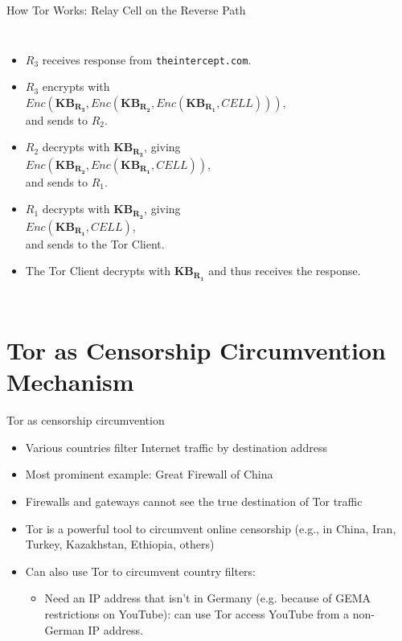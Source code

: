 \documentclass[9pt,a4paper]{beamer}
\begin{document}
\begin{frame}{How Tor Works: Relay Cell on the Reverse Path}
\begin{columns}
    \begin{itemize}
      \item $R_3$ receives response from \texttt{theintercept.com}.
      \item<2-> $R_3$ encrypts with \\
        $Enc(\mathbf{KB_{R_3}}, Enc(\mathbf{KB_{R_2}}, Enc(\mathbf{KB_{R_1}}, CELL)))$, \\
        and sends to $R_2$.
      \item<5-> $R_2$ decrypts with $\mathbf{KB_{R_3}}$, giving \\
        $Enc(\mathbf{KB_{R_2}}, Enc(\mathbf{KB_{R_1}}, CELL))$, \\
        and sends to $R_1$.
      \item<6-> $R_1$ decrypts with $\mathbf{KB_{R_2}}$, giving \\
        $Enc(\mathbf{KB_{R_1}}, CELL)$, \\
        and sends to the Tor Client.
      \item<7-> The Tor Client decrypts with $\mathbf{KB_{R_1}}$ and thus receives the response.
    \end{itemize}
  \end{columns}
\end{frame}


\section{Tor as Censorship Circumvention Mechanism}

\begin{frame}{Tor as censorship circumvention}
  \begin{itemize}
    \item Various countries filter Internet traffic by destination address
    \item Most prominent example: Great Firewall of China
    \item<2-> Firewalls and gateways cannot see the true destination of Tor traffic
    \item<2-> Tor is a powerful tool to circumvent online censorship (e.g., in China,
      Iran, Turkey, Kazakhstan, Ethiopia, others)
    \item<3-> Can also use Tor to circumvent country filters:
      \begin{itemize}
      \item Need an IP address that isn't in Germany (e.g. because of GEMA
        restrictions on YouTube): can use Tor access YouTube from a non-German
        IP address.
      \end{itemize}
  \end{itemize}
\end{frame}
\end{document}
